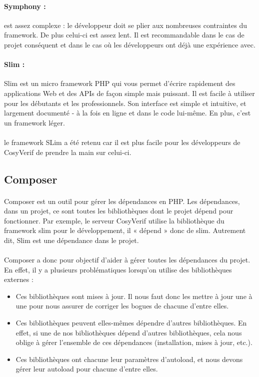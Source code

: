 \documentclass{report}
\begin{document}
\paragraph{Symphony :}
est assez complexe : le développeur doit se plier aux nombreuses contraintes du framework. De plus celui-ci est 
assez lent. Il est recommandable dans le cas de projet conséquent et dans le cas où les développeurs ont déjà une 
expérience avec.

\paragraph{Slim :}
Slim est un micro framework PHP qui vous permet d'écrire rapidement des applications Web et des APIs de façon simple 
mais puissant. Il est facile à utiliser pour les débutants et les professionnels. Son interface est simple et intuitive, et 
largement documenté - à la fois en ligne et dans le code lui-même. En plus, c'est un framework léger.

\paragraph{}
le framework SLim a été retenu car il est plus facile pour les développeurs de CosyVerif de prendre la main sur celui-ci.

\subsection{Composer}

\paragraph{}
Composer est un outil pour gérer les dépendances en PHP. Les dépendances, dans un projet, ce sont toutes les 
bibliothèques dont le projet dépend pour fonctionner. Par exemple, le serveur CosyVerif utilise la bibliothèque 
du framework slim pour le développement, il « dépend » donc de slim. Autrement dit, Slim est une dépendance 
dans le projet.

\paragraph{}
Composer a donc pour objectif d'aider à gérer toutes les dépendances du projet. En effet, il y a plusieurs problématiques
lorsqu'on utilise des bibliothèques externes :

\begin{itemize}
\item  Ces bibliothèques sont mises à jour. Il nous faut donc les mettre à jour une à une pour nous assurer de corriger les
 bogues de chacune d'entre elles.
\item Ces bibliothèques peuvent elles-mêmes dépendre d'autres bibliothèques. En effet, si une de nos bibliothèques 
dépend d'autres bibliothèques, cela nous oblige à gérer l'ensemble de ces dépendances (installation, mises à jour, etc.).
\item Ces bibliothèques ont chacune leur paramètres d'autoload, et nous devons gérer leur autoload pour chacune 
d'entre elles.
\end{itemize}
\end{document}
